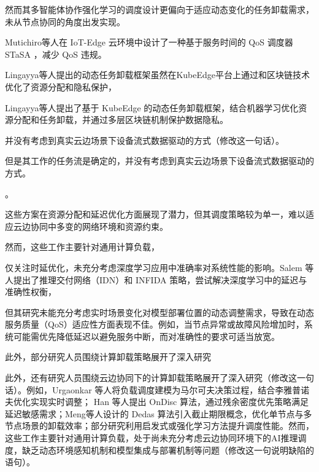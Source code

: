 然而其多智能体协作强化学习的调度设计更偏向于适应动态变化的任务卸载需求，未从节点协同的角度出发实现。

Mutichiro等人\cite{mutichiro2021qos}在 IoT-Edge 云环境中设计了一种基于服务时间的 QoS 调度器 STaSA ，减少 QoS 违规。




Lingayya等人提出的动态任务卸载框架虽然在KubeEdge平台上通过和区块链技术优化了资源分配和隐私保护，

Lingayya等人提出了基于 KubeEdge 的动态任务卸载框架，结合机器学习优化资源分配和任务卸载，并通过多层区块链机制保护数据隐私。

并没有考虑到真实云边场景下设备流式数据驱动的方式（修改这一句话）。

但是其工作的任务流是确定的，并没有考虑到真实云边场景下设备流式数据驱动的方式。

。



这些方案在资源分配和延迟优化方面展现了潜力，但其调度策略较为单一，难以适应云边协同中多变的网络环境和资源约束。




然而，这些工作主要针对通用计算负载，

仅关注时延优化，未充分考虑深度学习应用中准确率对系统性能的影响。Salem 等人\cite{salem2023toward}提出了推理交付网络（IDN）和 INFIDA 策略，尝试解决深度学习中的延迟与准确性权衡，

但其研究未能充分考虑实时场景变化对模型部署位置的动态调整需求，导致在动态服务质量（QoS）适应性方面表现不佳。例如，当节点异常或故障风险增加时，系统可能需优先降低延迟以避免服务中断，而对准确性的要求可适当放宽。




此外，部分研究人员围绕计算卸载策略展开了深入研究

此外，还有研究人员围绕云边协同下的计算卸载策略展开了深入研究（修改这一句话）。例如，Urgaonkar 等人\cite{urgaonkar2015dynamic}将负载调度建模为马尔可夫决策过程，结合李雅普诺夫优化实现实时调整；
Han 等人\cite{han2019ondisc}提出 OnDisc 算法，通过残余密度优先策略满足延迟敏感需求；Meng等人\cite{meng2019online}设计的 Dedas 算法引入截止期限概念，优化单节点与多节点场景的卸载效率；部分研究\cite{崔玉亚2021一种面向移动边缘计算的多用户细粒度任务卸载调度方法,邝祝芳2022基于深度强化学习的多用户边缘计算任务卸载调度与资源分配算法,郑守建2022一种基于综合匹配度的边缘计算系统任务调度方法,张斐斐2023边缘计算中协作计算卸载与动态任务调度}利用启发式或强化学习方法提升调度性能。然而，这些工作主要针对通用计算负载，处于尚未充分考虑云边协同环境下的AI推理调度，缺乏动态环境感知机制和模型集成与部署机制等问题（修改这一句说明缺陷的语句）。


